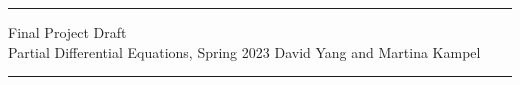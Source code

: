 \documentclass[11pt]{article}
\begin{document}
	\hrule
	\begin{center}
		{\Large Final Project Draft} \\ %
		\vspace{0.2cm}
		Partial Differential Equations, Spring 2023 \hfill David Yang and Martina Kampel%
	\end{center}

\hrule

\vspace{1em}



\newpage


\printbibliography
\end{document}
